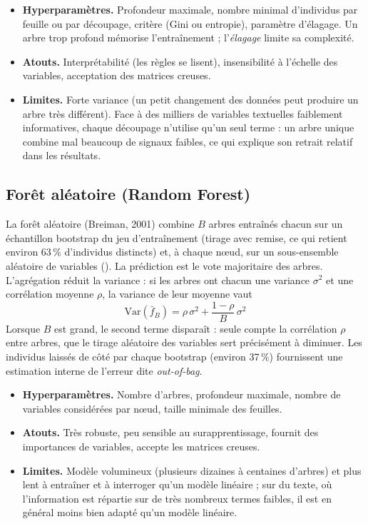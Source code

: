 \documentclass[11pt,a4paper]{report}
\makeatletter
\numberwithin{equation}{chapter}
\DeclareRobustCommand{\code}[1]{{\ttfamily\fontsize{\strip@pt\dimexpr\f@size pt*9/10\relax}{\f@baselineskip}\selectfont\detokenize{#1}}}
\makeatother
\begin{document}
\begin{itemize}
\item \textbf{Hyperparamètres.} Profondeur maximale, nombre minimal d'individus par feuille ou par découpage, critère (Gini ou entropie), paramètre d'élagage. Un arbre trop profond mémorise l'entraînement ; l'\textit{élagage} limite sa complexité.
\item \textbf{Atouts.} Interprétabilité (les règles se lisent), insensibilité à l'échelle des variables, acceptation des matrices creuses.
\item \textbf{Limites.} Forte variance (un petit changement des données peut produire un arbre très différent). Face à des milliers de variables textuelles faiblement informatives, chaque découpage n'utilise qu'un seul terme : un arbre unique combine mal beaucoup de signaux faibles, ce qui explique son retrait relatif dans les résultats.
\end{itemize}

\subsection{Forêt aléatoire (Random Forest)}
La forêt aléatoire (Breiman, 2001) combine $B$ arbres entraînés chacun sur un échantillon bootstrap du jeu d'entraînement (tirage avec remise, ce qui retient environ 63\,\% d'individus distincts) et, à chaque n\oe ud, sur un sous-ensemble aléatoire de variables (\code{max_features}). La prédiction est le vote majoritaire des arbres. L'agrégation réduit la variance : si les arbres ont chacun une variance $\sigma^2$ et une corrélation moyenne $\rho$, la variance de leur moyenne vaut
\begin{equation}\label{eq:varrf}
\mathrm{Var}(\bar{f}_B) = \rho\,\sigma^2 + \frac{1-\rho}{B}\,\sigma^2
\end{equation}
Lorsque $B$ est grand, le second terme disparaît : seule compte la corrélation $\rho$ entre arbres, que le tirage aléatoire des variables sert précisément à diminuer. Les individus laissés de côté par chaque bootstrap (environ 37\,\%) fournissent une estimation interne de l'erreur dite \textit{out-of-bag}.
\begin{itemize}
\item \textbf{Hyperparamètres.} Nombre d'arbres, profondeur maximale, nombre de variables considérées par n\oe ud, taille minimale des feuilles.
\item \textbf{Atouts.} Très robuste, peu sensible au surapprentissage, fournit des importances de variables, accepte les matrices creuses.
\item \textbf{Limites.} Modèle volumineux (plusieurs dizaines à centaines d'arbres) et plus lent à entraîner et à interroger qu'un modèle linéaire ; sur du texte, où l'information est répartie sur de très nombreux termes faibles, il est en général moins bien adapté qu'un modèle linéaire.
\end{itemize}
\end{document}
